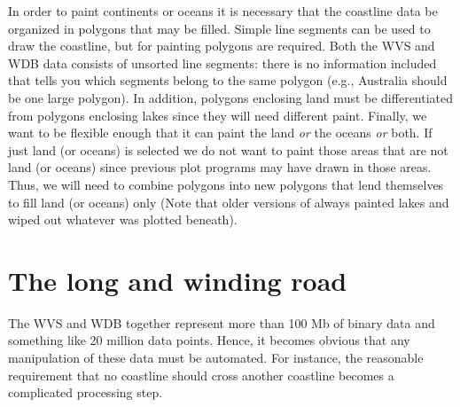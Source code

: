 In order to paint continents or oceans it is necessary that the
coastline data be organized in polygons that may be filled.
Simple line segments can be used to draw the coastline, but for
painting polygons are required.  Both the WVS and WDB data
consists of unsorted line segments: there is no information
included that tells you which segments belong to the same
polygon (e.g., Australia should be one large polygon).
In addition, polygons enclosing land must be differentiated from
polygons enclosing lakes since they will need different paint.
Finally, we want  to be flexible enough that it can
paint the land \emph{or} the oceans \emph{or} both.
If just land (or oceans) is selected we do not want to paint
those areas that are not land (or oceans) since previous plot
programs may have drawn in those areas.  Thus, we will need to
combine polygons into new polygons that lend themselves to fill
land (or oceans) only (Note that older versions of 
always painted lakes and wiped out whatever was plotted beneath).

\section{The long and winding road} 

The WVS and WDB together represent more than 100 Mb of binary
data and something like 20 million data points.  Hence, it
becomes obvious that any manipulation of these data must be
automated.  For instance, the reasonable requirement that no
coastline should cross another coastline becomes a complicated
processing step.

